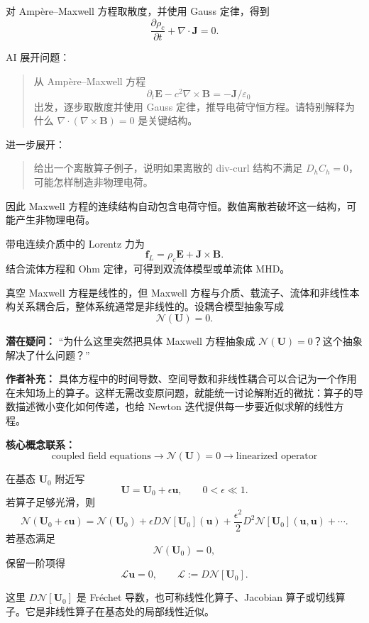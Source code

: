 \documentclass[11pt,openany]{ctexbook}
\newcommand{\Lop}{\mathcal L}
\newcommand{\Nop}{\mathcal N}
\begin{document}
对 Amp\`ere--Maxwell 方程取散度，并使用 Gauss 定律，得到
\[
\frac{\partial\rho_c}{\partial t}
+\nabla\cdot\bm J=0.
\]

\begin{askai}
AI 展开问题：
\begin{quote}
从 Amp\`ere--Maxwell 方程
\[
\partial_t\bm E-c^2\nabla\times\bm B=-\bm J/\varepsilon_0
\]
出发，逐步取散度并使用 Gauss 定律，推导电荷守恒方程。请特别解释为什么 \(\nabla\cdot(\nabla\times\bm B)=0\) 是关键结构。
\end{quote}

进一步展开：
\begin{quote}
给出一个离散算子例子，说明如果离散的 div-curl 结构不满足 \(D_hC_h=0\)，可能怎样制造非物理电荷。
\end{quote}
\end{askai}

因此 Maxwell 方程的连续结构自动包含电荷守恒。数值离散若破坏这一结构，可能产生非物理电荷。

带电连续介质中的 Lorentz 力为
\[
\bm f_L=\rho_c\bm E+\bm J\times\bm B.
\]
结合流体方程和 Ohm 定律，可得到双流体模型或单流体 MHD。

真空 Maxwell 方程是线性的，但 Maxwell 方程与介质、载流子、流体和非线性本构关系耦合后，整体系统通常是非线性的。设耦合模型抽象写成
\[
\Nop(\bm U)=0.
\]

\begin{authornote}
\textbf{潜在疑问：}
“为什么这里突然把具体 Maxwell 方程抽象成 \(\Nop(\bm U)=0\)？这个抽象解决了什么问题？”

\textbf{作者补充：}
具体方程中的时间导数、空间导数和非线性耦合可以合记为一个作用在未知场上的算子。这样无需改变原问题，就能统一讨论解附近的微扰：算子的导数描述微小变化如何传递，也给 Newton 迭代提供每一步要近似求解的线性方程。

\textbf{核心概念联系：}
\[
\text{coupled field equations}
\longrightarrow
\Nop(\bm U)=0
\longrightarrow
\text{linearized operator}
\]
\end{authornote}

在基态 \(\bm U_0\) 附近写
\[
\bm U=\bm U_0+\epsilon\bm u,
\qquad 0<\epsilon\ll1.
\]
若算子足够光滑，则
\[
\Nop(\bm U_0+\epsilon\bm u)
=
\Nop(\bm U_0)
+\epsilon D\Nop[\bm U_0](\bm u)
+\frac{\epsilon^2}{2}
D^2\Nop[\bm U_0](\bm u,\bm u)
+\cdots.
\]
若基态满足
\[
\Nop(\bm U_0)=0,
\]
保留一阶项得
\[
\Lop\bm u=0,
\qquad
\Lop:=D\Nop[\bm U_0].
\]

这里 \(D\Nop[\bm U_0]\) 是 Fr\'echet 导数，也可称线性化算子、Jacobian 算子或切线算子。它是非线性算子在基态处的局部线性近似。
\end{document}
